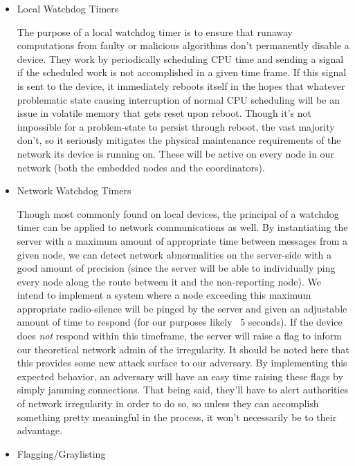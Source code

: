 \documentclass[tikz,a4paper,titlepage]{article}
\begin{document}
\begin{itemize}
    \item Local Watchdog Timers
    
    The purpose of a local watchdog timer is to ensure that runaway computations from faulty or malicious algorithms don't permanently disable a device. They work by periodically scheduling CPU time and sending a signal if the scheduled work is not accomplished in a given time frame. If this signal is sent to the device, it immediately reboots itself in the hopes that whatever problematic state causing interruption of normal CPU scheduling will be an issue in volatile memory that gets reset upon reboot. Though it's not impossible for a problem-state to persist through reboot, the vast majority don't, so it seriously mitigates the physical maintenance requirements of the network its device is running on. These will be active on every node in our network (both the embedded nodes and the coordinators).
    \item Network Watchdog Timers
    
    Though most commonly found on local devices, the principal of a watchdog timer can be applied to network communications as well. By instantiating the server with a maximum amount of appropriate time between messages from a given node, we can detect network abnormalities on the server-side with a good amount of precision (since the server will be able to individually ping every node along the route between it and the non-reporting node). We intend to implement a system where a node exceeding this maximum appropriate radio-silence will be pinged by the server and given an adjustable amount of time to respond (for our purposes likely ~5 seconds). If the device does \textit{not} respond within this timeframe, the server will raise a flag to inform our theoretical network admin of the irregularity. It should be noted here that this provides some new attack surface to our adversary. By implementing this expected behavior, an adversary will have an easy time raising these flags by simply jamming connections. That being said, they'll have to alert authorities of network irregularity in order to do so, so unless they can accomplish something pretty meaningful in the process, it won't necessarily be to their advantage.
    \item Flagging/Graylisting
    

\end{itemize}
\end{document}
